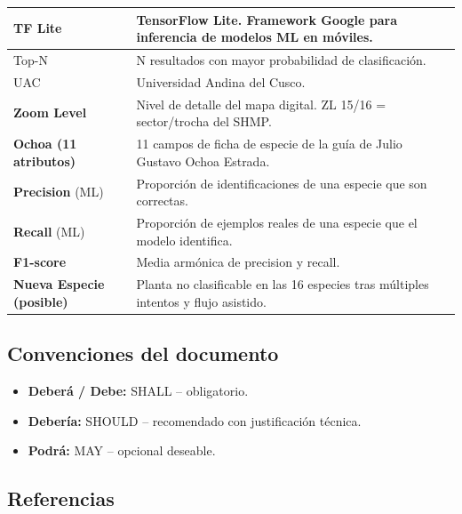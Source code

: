 \documentclass[12pt, a4paper]{article}
\begin{document}
\begin{longtable}{|p{3.2cm}|p{11.3cm}|}
\hline
TF Lite & TensorFlow Lite. Framework Google para inferencia de modelos ML en m\'oviles. \\
\hline
Top-N & N resultados con mayor probabilidad de clasificaci\'on. \\
\hline
UAC & Universidad Andina del Cusco. \\
\hline
\textbf{Zoom Level} & Nivel de detalle del mapa digital. ZL 15/16 = sector/trocha del SHMP. \\
\hline
\textbf{Ochoa (11 atributos)} & 11 campos de ficha de especie de la gu\'ia de Julio Gustavo Ochoa Estrada. \\
\hline
\textbf{Precision} (ML) & Proporci\'on de identificaciones de una especie que son correctas. \\
\hline
\textbf{Recall} (ML) & Proporci\'on de ejemplos reales de una especie que el modelo identifica. \\
\hline
\textbf{F1-score} & Media arm\'onica de precision y recall. \\
\hline
\textbf{Nueva Especie (posible)} & Planta no clasificable en las 16 especies tras m\'ultiples intentos y flujo asistido. \\
\hline
\end{longtable}

\subsection{Convenciones del documento}

\begin{itemize}
  \item \textbf{Deber\'a / Debe:} SHALL -- obligatorio.
  \item \textbf{Deber\'ia:} SHOULD -- recomendado con justificaci\'on t\'ecnica.
  \item \textbf{Podr\'a:} MAY -- opcional deseable.
\end{itemize}

\subsection{Referencias}
\end{document}
